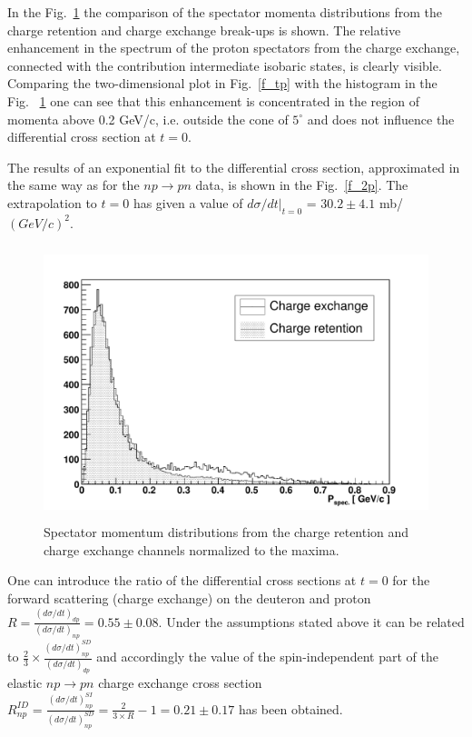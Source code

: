 \documentclass[a4paper,12pt]{article}
\begin{document}
In the Fig.~\ref{f_res} the comparison of the spectator momenta distributions
from the charge retention and charge exchange break-ups is shown. The relative
enhancement in the spectrum of the proton spectators from the charge exchange,
connected with the contribution intermediate isobaric states, is clearly
visible. Comparing the two-dimensional plot in Fig.~\ref{f_tp} with the
histogram in the Fig.~ \ref {f_res} one can see that this enhancement is
concentrated in the region of momenta above 0.2 GeV/c, i.e. outside the cone of
$5 ^{\circ}$ and does not influence the differential cross section at $t = 0 $.

The results of an exponential fit to the differential cross section,
approximated in the same way as for the  $np \to pn $ data, is shown in the
Fig.~\ref{f_2p}. The extrapolation to $t = 0$ has given a value of
$ d \sigma/dt\vert_{t=0}$ = $30.2 \pm 4.1$ mb/$(GeV/c)^{2}$.

\begin{figure}[!hbp]
  \begin{center}
    \includegraphics[angle=0,height=8cm]{fig_res.pdf}
    \caption { Spectator momentum distributions from the charge retention and
      charge exchange channels normalized to the  maxima.} \label {f_res}
  \end{center}
\end{figure}

One can introduce the ratio of the differential cross sections at $t = 0 $
for the forward scattering (charge exchange) on the deuteron and proton
$R = \frac {(d \sigma/dt) _ {dp}} {(d \sigma/dt) _ {np}} = 0.55 \pm 0.08 $.
Under the assumptions stated above it can be related to
$\frac {2} {3} \times \frac {(d \sigma/dt) _ {np}^ {SD}} {(d \sigma/dt) _ {dp}}$
and accordingly the value of the spin-independent part of the elastic
$np \to pn $ charge exchange  cross section $R^{ID}_{np} = \frac {(d \sigma/dt) _
  {np}^{SI}} {(d \sigma/dt)_{np}^{SD}} = {\frac {2} {3 \times R} - 1} =
0.21 \pm 0.17$ has been obtained.
\end{document}
